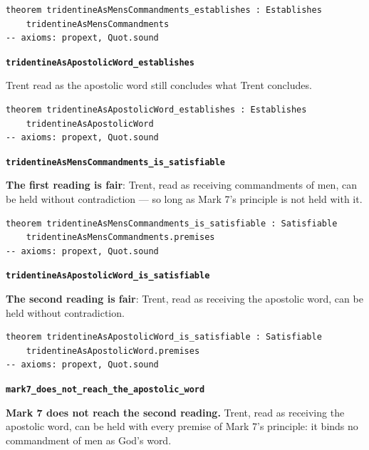 \documentclass[11pt]{article}
\begin{document}
{\small\begin{verbatim}
theorem tridentineAsMensCommandments_establishes : Establishes
    tridentineAsMensCommandments
-- axioms: propext, Quot.sound
\end{verbatim}}
\par\medskip\noindent\textbf{\texttt{tridentine\allowbreak{}As\allowbreak{}Apostolic\allowbreak{}Word\_\allowbreak{}establishes}}\par\nobreak\noindent
Trent read as the apostolic word still concludes what Trent concludes.

{\small\begin{verbatim}
theorem tridentineAsApostolicWord_establishes : Establishes
    tridentineAsApostolicWord
-- axioms: propext, Quot.sound
\end{verbatim}}
\par\medskip\noindent\textbf{\texttt{tridentine\allowbreak{}As\allowbreak{}Mens\allowbreak{}Commandments\_\allowbreak{}is\_\allowbreak{}satisfiable}}\par\nobreak\noindent
\textbf{The first reading is fair}: Trent, read as receiving commandments of men, can be held without contradiction — so long as Mark 7's principle is not held with it.

{\small\begin{verbatim}
theorem tridentineAsMensCommandments_is_satisfiable : Satisfiable
    tridentineAsMensCommandments.premises
-- axioms: propext, Quot.sound
\end{verbatim}}
\par\medskip\noindent\textbf{\texttt{tridentine\allowbreak{}As\allowbreak{}Apostolic\allowbreak{}Word\_\allowbreak{}is\_\allowbreak{}satisfiable}}\par\nobreak\noindent
\textbf{The second reading is fair}: Trent, read as receiving the apostolic word, can be held without contradiction.

{\small\begin{verbatim}
theorem tridentineAsApostolicWord_is_satisfiable : Satisfiable
    tridentineAsApostolicWord.premises
-- axioms: propext, Quot.sound
\end{verbatim}}
\par\medskip\noindent\textbf{\texttt{mark7\_\allowbreak{}does\_\allowbreak{}not\_\allowbreak{}reach\_\allowbreak{}the\_\allowbreak{}apostolic\_\allowbreak{}word}}\par\nobreak\noindent
\textbf{Mark 7 does not reach the second reading.} Trent, read as receiving the apostolic word, can be held with every premise of Mark 7's principle: it binds no commandment of men as God's word.
\end{document}
